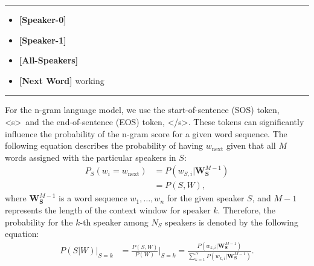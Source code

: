 \documentclass{article}
\begin{document}
\vspace{-4px}
\noindent\rule{\linewidth}{0.8pt}
{\scriptsize 
\begin{itemize}[label={},leftmargin=*,labelsep=0.0em,topsep=0pt]
\vspace{-1px}
\item \textbf{[Speaker-0]}
\item \textbf{[Speaker-1]}
\item \textbf{[All-Speakers]}
  \item \textbf{[Next Word]} {\ttfamily working}
\vspace{-4px}
\end{itemize} 
}
\vspace{-2px}
\noindent\rule{\linewidth}{0.8pt}
For the n-gram language model, we use the start-of-sentence (SOS) token, \textless s\textgreater~and the end-of-sentence (EOS) token, \textless /s\textgreater. These tokens can significantly influence the probability of the n-gram score for a given word sequence. The following equation describes the probability of having $w_{\text{next}}$ given that all $M$ words assigned with the particular speakers in $S$:
\begin{align}
P_{S}\left( w_{i}=w_{\text{next}} \right) 
& = P(w_{S, i}|\mathbf{W}_{\mathbf{S}}^{M-1}) \label{eq:n_gram_spk_a1}\\ 
& =P(S, W), \label{eq:n_gram_spk_a2}
\end{align}
where $\textbf{W}_{\mathbf{S}}^{M-1}$ is a word sequence $w_{1}, \ldots, w_{n}$ for the given speaker $S$, and $M-1$ represents the length of the context window for speaker $k$. Therefore,  the probability for the $k$-th speaker among $N_{S}$ speakers is denoted by the following equation:
\begin{align}
P(S|W)\rvert_{S=k} &= \frac{P(S, W)}{P(W)}\bigg|_{S=k} = \frac{P(w_{k, i}|\mathbf{W}_{\mathbf{S}}^{M-1})}{\sum_{k=1}^{N} P(w_{k, i}|\mathbf{W}_{\mathbf{S}}^{M-1})} \label{eq:n_gram_spk_b1}.
\end{align}
\end{document}
